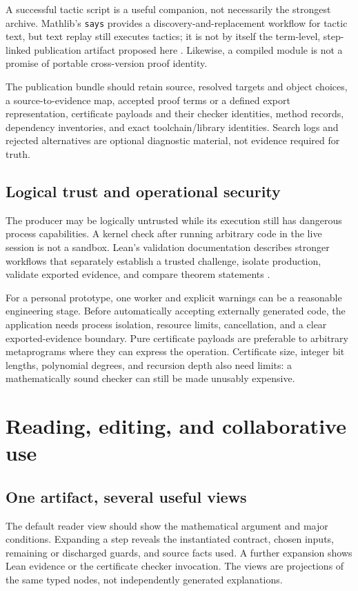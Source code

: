 \documentclass[11pt,a4paper]{article}
\newcommand{\code}[1]{\nolinkurl{#1}}
\theoremstyle{definition}
\begin{document}
A successful tactic script is a useful companion, not necessarily the strongest
archive. Mathlib's \code{says} provides a discovery-and-replacement workflow for
tactic text, but text replay still executes tactics; it is not by itself the
term-level, step-linked publication artifact proposed here \cite{mathlib-says}.
Likewise, a compiled module is not a promise of portable cross-version proof
identity.

The publication bundle should retain source, resolved targets and object choices,
a source-to-evidence map, accepted proof terms or a defined export representation,
certificate payloads and their checker identities, method records, dependency
inventories, and exact toolchain/library identities. Search logs and rejected
alternatives are optional diagnostic material, not evidence required for truth.

\subsection{Logical trust and operational security}
The producer may be logically untrusted while its execution still has dangerous
process capabilities. A kernel check after running arbitrary code in the live
session is not a sandbox. Lean's validation documentation describes stronger
workflows that separately establish a trusted challenge, isolate production,
validate exported evidence, and compare theorem statements \cite{lean-validation}.

For a personal prototype, one worker and explicit warnings can be a reasonable
engineering stage. Before automatically accepting externally generated code,
the application needs process isolation, resource limits, cancellation, and a
clear exported-evidence boundary. Pure certificate payloads are preferable to
arbitrary metaprograms where they can express the operation. Certificate size,
integer bit lengths, polynomial degrees, and recursion depth also need limits:
a mathematically sound checker can still be made unusably expensive.

\section{Reading, editing, and collaborative use}
\label{sec:interaction}
\subsection{One artifact, several useful views}
The default reader view should show the mathematical argument and major
conditions. Expanding a step reveals the instantiated contract, chosen inputs,
remaining or discharged guards, and source facts used. A further expansion
shows Lean evidence or the certificate checker invocation. The views are
projections of the same typed nodes, not independently generated explanations.
\end{document}
